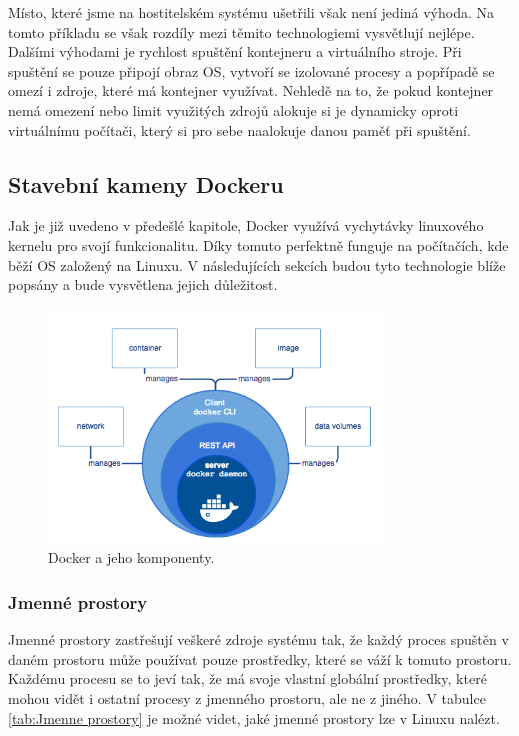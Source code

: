 Místo, které jsme na hostitelském systému ušetřili však není jediná výhoda. Na tomto příkladu se však rozdíly mezi těmito technologiemi vysvětlují nejlépe. Dalšími výhodami je rychlost spuštění kontejneru a virtuálního stroje. Při spuštění se pouze připojí obraz OS, vytvoří se izolované procesy a popřípadě se omezí i zdroje, které má kontejner využívat. Nehledě na to, že pokud kontejner nemá omezení nebo limit využitých zdrojů alokuje si je dynamicky oproti virtuálnímu počítači, který si pro sebe naalokuje danou paměť při spuštění.  


\subsection{Stavební kameny Dockeru}

Jak je již uvedeno v předešlé kapitole, Docker využívá vychytávky linuxového kernelu pro svojí funkcionalitu. Díky tomuto perfektně funguje na počítačích, kde běží OS založený na Linuxu. V následujících sekcích budou tyto technologie blíže popsány a bude vysvětlena jejich důležitost. 


\begin{figure}[!ht]
	\centering
	\includegraphics[width=0.8\textwidth, angle=0]{docker-architecture.png}
	\caption[Docker architektura]{Docker a jeho komponenty.}
	\label{fig:docker-architecture}
\end{figure}


\subsubsection{Jmenné prostory}

Jmenné prostory zastřešují veškeré zdroje systému tak, že každý proces spuštěn v daném prostoru může používat pouze prostředky, které se váží k tomuto prostoru. Každému procesu se to jeví tak, že má svoje vlastní globální prostředky, které mohou vidět i ostatní procesy z jmenného prostoru, ale ne z jiného. V tabulce \ref{tab:Jmenne prostory} je možné videt, jaké jmenné prostory lze v Linuxu nalézt.

